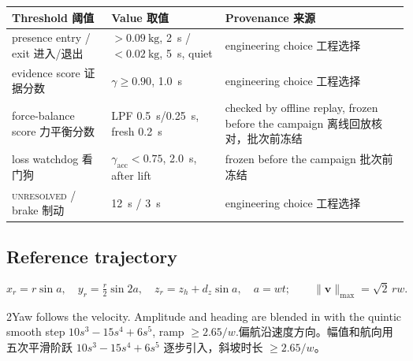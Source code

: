 \documentclass[10pt,a4paper]{article}
\numberwithin{equation}{section}
\newcommand{\pair}[2]{\begin{paracol}{2}#1\switchcolumn #2\end{paracol}}
\newcommand{\bsub}[2]{\needspace{8\baselineskip}\subsection{#1\quad{\normalfont #2}}}
\begin{document}
\begin{center}\small
\begin{tabularx}{\textwidth}{@{}l l X@{}}
\toprule
Threshold 阈值 & Value 取值 & Provenance 来源\\
\midrule
presence entry / exit 进入/退出 & $>\SI{0.09}{\kg}$, \SI{2}{s} / $<\SI{0.02}{\kg}$, \SI{5}{s}, quiet & engineering choice 工程选择\\
evidence score 证据分数 & $\gamma\ge0.90$, \SI{1.0}{s} & engineering choice 工程选择\\
force-balance score 力平衡分数 & LPF \SI{0.5}{s}/\SI{0.25}{s}, fresh \SI{0.2}{s} & checked by offline replay, frozen before the campaign 离线回放核对，批次前冻结\\
loss watchdog 看门狗 & $\gamma_{\mathrm{acc}}<0.75$, \SI{2.0}{s}, after lift & frozen before the campaign 批次前冻结\\
\textsc{unresolved} / brake 制动 & \SI{12}{s} / \SI{3}{s} & engineering choice 工程选择\\
\bottomrule
\end{tabularx}
\end{center}

\bsub{Reference trajectory}{参考轨迹}
\begin{equation}
x_r=r\sin a,\quad y_r=\tfrac r2\sin2a,\quad z_r=z_h+d_z\sin a,\quad a=wt;\qquad
\lVert\bm v\rVert_{\max}=\sqrt2\,rw .
\end{equation}
\pair{Yaw follows the velocity. Amplitude and heading are blended in with the
quintic smooth step $10s^3-15s^4+6s^5$, ramp $\ge2.65/w$.}
{偏航沿速度方向。幅值和航向用五次平滑阶跃 $10s^3-15s^4+6s^5$ 逐步引入，斜坡时长 $\ge2.65/w$。}
\end{document}
